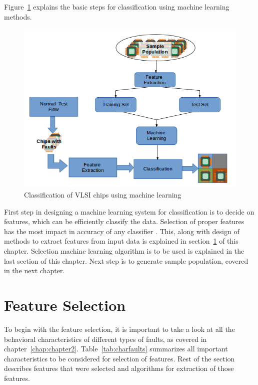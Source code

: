 Figure~\ref{fig:mlsteps} explains the basic steps for classification using machine learning methods.

\begin{figure}[h]
  \begin{center}
    \captionsetup{justification=centering}
    \includegraphics[scale=0.65]{figures/mlsteps.png}
    \caption{Classification of VLSI chips using machine learning}
    \label{fig:mlsteps}
  \end{center}
\end{figure}

First step in designing a machine learning system for classification is to decide on features, which can be efficiently classify the data. Selection of proper features has the most impact in accuracy of any classifier \cite{Michie1994}. This, along with design of methods to extract features from input data is explained in section~\ref{sec:secfs} of this chapter. Selection machine learning algorithm is to be used is explained in the last section of this chapter. Next step is to generate sample population, covered in the next chapter.

\section{Feature Selection}
\label{sec:secfs}
To begin with the feature selection, it is important to take a look at all the behavioral characteristics of different types of faults, as covered in chapter~\ref{chap:chapter2}. Table~\ref{tab:charfaults} summarizes all important characteristics to be considered for selection of features. Rest of the section describes features that were selected and algorithms for extraction of those features.

